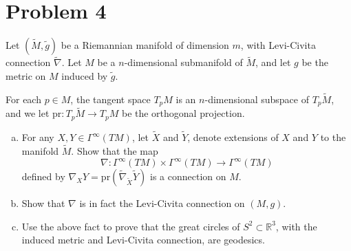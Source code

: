 \documentclass[a4paper]{article}
\begin{document}
\section*{Problem 4}%

Let $(\tilde{M}, \tilde{g})$ be a Riemannian manifold of dimension $m$, with Levi-Civita connection $\tilde{\nabla}$. Let $M$ be a $n$-dimensional submanifold of $\tilde{M}$, and let $g$ be the metric on $M$ induced by $\tilde{g}$.

\medskip

For each $p \in M$, the tangent space $T_pM$ is an $n$-dimensional subspace of $T_p\tilde{M}$, and we let $\text{pr}: T_p \tilde{M} \rightarrow T_pM$ be the orthogonal projection.
\begin{enumerate}[(a)]
  \item For any $X,Y \in \Gamma^{\infty}(TM)$, let $\tilde{X}$ and $\tilde{Y}$, denote extensions of $X$ and $Y$ to the manifold $\tilde{M}$. Show that the map 
    \[
      \nabla: \Gamma^{\infty}(TM) \times \Gamma^{\infty}(TM) \rightarrow \Gamma^{\infty}(TM)
    \]
    defined by $\nabla_X Y = \text{pr}(\tilde{\nabla}_{\tilde{X}}\tilde{Y})$ is a connection on $M$.
  \item Show that $\nabla$ is in fact the Levi-Civita connection on $(M,g)$.
  \item Use the above fact to prove that the great circles of $S^2 \subset \mathds{R}^3$, with the induced metric and Levi-Civita connection, are geodesics.
\end{enumerate}
\end{document}
